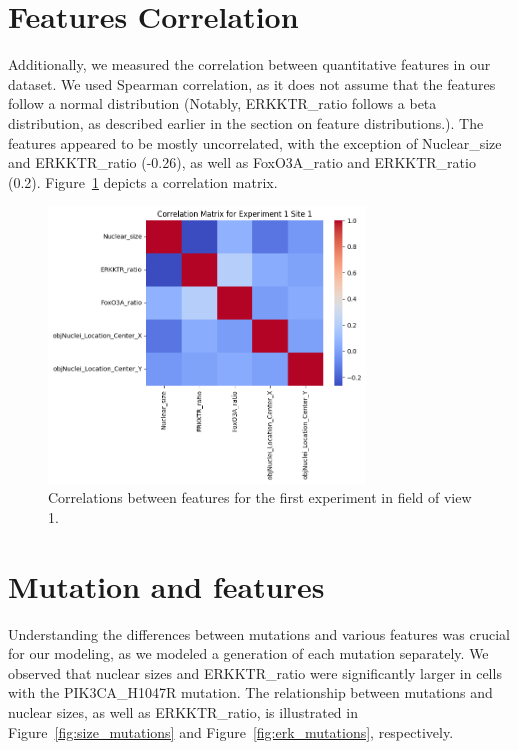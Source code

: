 \documentclass[licencjacka,en]{pracamgr}
\begin{document}
\section{Features Correlation}

Additionally, we measured the correlation between quantitative features in our dataset. We used Spearman correlation, as it does not assume that the features follow a normal distribution (Notably, ERKKTR\_ratio follows a beta distribution, as described earlier in the section on feature distributions.). The features appeared to be mostly uncorrelated, with the exception of Nuclear\_size and ERKKTR\_ratio (-0.26), as well as FoxO3A\_ratio and ERKKTR\_ratio (0.2). Figure~\ref{fig:correlation} depicts a correlation matrix.


\begin{figure}[ht]
    \centering
    \includegraphics[width=0.75\textwidth]{images/correlation.png}
    \caption{Correlations between features for the first experiment in field of view 1.}
    \label{fig:correlation}
\end{figure} 

\section{Mutation and features}
Understanding the differences between mutations and various features was crucial for our modeling, as we modeled a generation of each mutation separately. We observed that nuclear sizes and ERKKTR\_ratio were significantly larger in cells with the PIK3CA\_H1047R mutation. The relationship between mutations and nuclear sizes, as well as ERKKTR\_ratio, is illustrated in Figure~\ref{fig:size_mutations} and Figure~\ref{fig:erk_mutations}, respectively.
\end{document}
